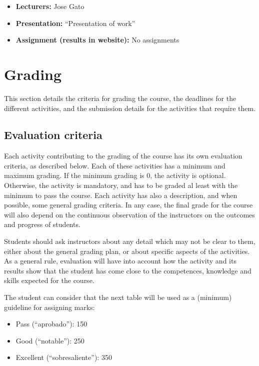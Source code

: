\documentclass[a4paper]{article}
\begin{document}
\begin{itemize}
\item \textbf{Lecturers:} Jose Gato
\item \textbf{Presentation:} ``Presentation of work''
\item \textbf{Assignment (results in website):} No assignments
\end{itemize}




\section{Grading}

This section details the criteria for grading the course, the
deadlines for the different activities, and the submission details for
the activities that require them.

\subsection{Evaluation criteria}
\label{sub:evaluation-criteria}

Each activity contributing to the grading of the course has its own
evaluation criteria, as described below. Each of these activities has
a minimum and maximum grading. If the minimum grading is 0, the
activity is optional. Otherwise, the activity is mandatory, and has to
be graded al least with the minimum to pass the course. Each activity
has also a description, and when possible, some general grading
criteria. In any case, the final grade for the course will also depend
on the continuous observation of the instructors on the outcomes and
progress of students.

Students should ask instructors about any detail which may not be
clear to them, either about the general grading plan, or about
specific aspects of the activities. As a general rule, evaluation will
have into account how the activity and its results show that the
student has come close to the competences, knowledge and skills
expected for the course.

The student can consider that the next table will be used as a
(minimum) guideline for assigning marks:

\begin{itemize}
\item Pass (``aprobado''): 150
\item Good (``notable''): 250
\item Excellent (``sobresaliente''): 350
\end{itemize}
\end{document}
